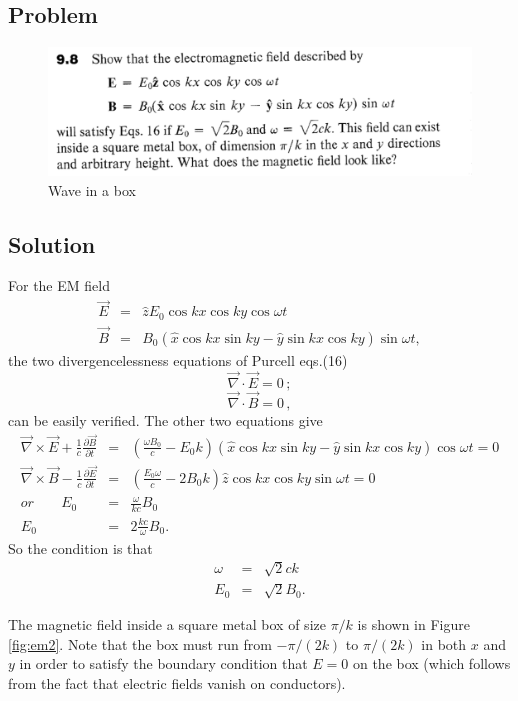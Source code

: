 \documentclass[solutions]{esg8022pset}
\begin{document}
\subsection{Problem}
\begin{figure}[H]
    \centering
    \includegraphics[width = 15cm]{pu908}
    \caption{Wave in a box}
  \end{figure}

\subsection{Solution}
For the EM field
\begin{eqnarray}
\vec{E} &=& \hat{z}E_0 \cos kx\cos ky\cos \omega t\\
\vec{B} &=&
B_0(\hat{x}\cos kx\sin ky-\hat{y}\sin kx\cos ky)\sin \omega t,
\end{eqnarray}
the two divergencelessness equations of Purcell eqs.(16)
\[ \vec{\nabla}\cdot\vec{E}=0 \,;\]
\[ \vec{\nabla}\cdot\vec{B}=0 \,,\]
can be easily verified.  The other two equations give
\begin{eqnarray}
\vec{\nabla}\times\vec{E}+\frac{1}{c}\frac{\partial \vec{B}}{\partial
t} &=& (\frac{\omega B_0}{c}-E_0 k)(\hat{x}\cos kx\sin ky
-\hat{y}\sin kx \cos ky)\cos \omega t =0\nonumber\\
\vec{\nabla}\times\vec{B}-\frac{1}{c}\frac{\partial \vec{E}}{\partial
t} &=& (\frac{E_0\omega}{c}-2B_0 k)\hat{z}\cos kx \cos ky \sin \omega
t =0\nonumber\\
or\;\;\;\;\;\;\; E_0 &=& \frac{\omega}{kc}B_0\\
E_0 &=& 2\frac{kc}{\omega}B_0.
\end{eqnarray}
So the condition is that
\begin{eqnarray}
\omega &=& \sqrt{2} ck\\
E_0 &=& \sqrt{2} B_0.
\end{eqnarray}

The magnetic field inside a square metal box of size $\pi/k$ is shown
in Figure \ref{fig:em2}.  Note that the box must run from $-\pi/(2k)$ to
$\pi/(2k)$ in both $x$ and $y$ in order to satisfy the boundary
condition that $E = 0$ on the box (which follows from the fact that
electric fields vanish on conductors).
\end{document}
